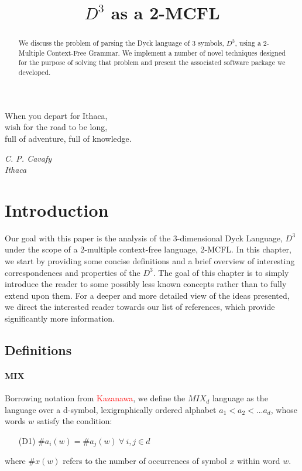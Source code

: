 \documentclass[nonatbib,numbers,10pt]{sigplanconf}
\title{$D^3$ as a 2-MCFL}
\newcommand\todo[1]{\textcolor{red}{#1}}
\begin{document}
\toappear{}

\maketitle

\begin{abstract}
We discuss the problem of parsing the Dyck language of 3 symbols, $D^3$, using a 2-Multiple Context-Free Grammar. We implement a number of novel techniques designed for the purpose of solving that problem and present the associated software package we developed.
\end{abstract}



\epigraph{When you depart for Ithaca,\\wish for the road to be long,\\full of adventure, full of knowledge.}{\textit{C. P. Cavafy\\ Ithaca}}

\section{Introduction}
Our goal with this paper is the analysis of the 3-dimensional Dyck Language, $D^3$ under the scope of a 2-multiple context-free language, 2-MCFL. In this chapter, we start by providing some concise definitions and a brief overview of interesting correspondences and properties of the $D^3$. The goal of this chapter is to simply introduce the reader to some possibly less known concepts rather than to fully extend upon them. For a deeper and more detailed view of the ideas presented, we direct the interested reader towards our list of references, which provide significantly more information.
\subsection{Definitions}
\paragraph{MIX}
Borrowing notation from \todo{Kazanawa}, we define the $MIX_d$ language as the language over a d-symbol, lexigraphically ordered alphabet $a_1 < a_2 < ... a_d$, whose words $w$ satisfy the condition:
\begin{itemize}
\item[(D1)]  $ \# a_i(w) = \# a_j(w) \ \forall \ i,j \in d $
\end{itemize}
where $ \#x(w)$ refers to the number of occurrences of symbol $x$ within word $w$.
\end{document}
